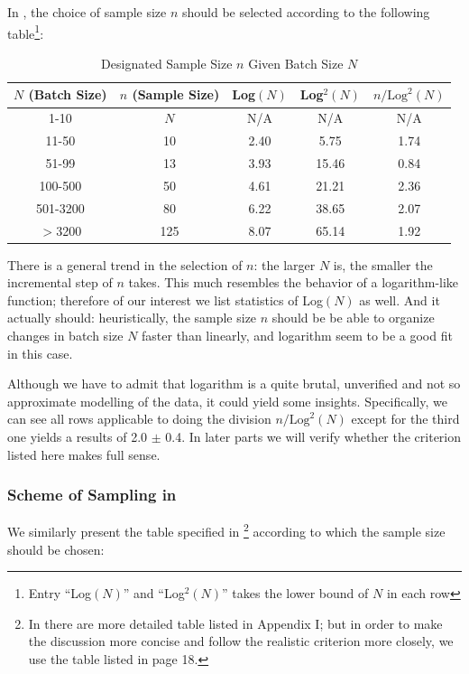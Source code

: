 \documentclass[12pt]{article}
\begin{document}
In \cite{JJF2005}, the choice of sample size $n$ should be selected according to the following table\footnote{Entry ``Log$(N)$'' and ``Log$^2(N)$'' takes the lower bound of $N$ in each row}:

\begin{table}[htbp]
    \centering
    \begin{tabular}{ccccc}
        \toprule
        $N$ (Batch Size) & $n$ (Sample Size) & Log$(N)$ & Log$^2(N)$ & $n/\text{Log}^2(N)$ \\
        \midrule
        1-10 & $N$ & N/A & N/A & N/A \\
        11-50 & 10 & 2.40 & 5.75 & 1.74 \\
        51-99 & 13 & 3.93 & 15.46 & 0.84 \\
        100-500 & 50 & 4.61 & 21.21 & 2.36 \\ 
        501-3200 & 80 & 6.22 & 38.65 & 2.07 \\
        $>$3200 & 125 & 8.07 & 65.14 & 1.92 \\
        \bottomrule
    \end{tabular}
    \caption{Designated Sample Size $n$ Given Batch Size $N$}
\end{table}

There is a general trend in the selection of $n$: the larger $N$ is, the smaller the incremental step of $n$ takes. This much resembles the behavior of a logarithm-like function; therefore of our interest we list statistics of Log$(N)$ as well. And it actually should: heuristically, the sample size $n$ should be be able to organize changes in batch size $N$ faster than linearly, and logarithm seem to be a good fit in this case. 

Although we have to admit that logarithm is a quite brutal, unverified and not so approximate modelling of the data, it could yield some insights. Specifically, we can see all rows applicable to doing the division $n/\text{Log}^2(N)$ except for the third one yields a results of 2.0 $\pm$ 0.4. In later parts we will verify whether the criterion listed here makes full sense. 

\subsubsection{Scheme of Sampling in \cite{OIML2016}}

We similarly present the table specified in \cite{OIML2016}\footnote{In \cite{OIML2016} there are more detailed table listed in Appendix I; but in order to make the discussion more concise and follow the realistic criterion more closely, we use the table listed in page 18.} according to which the sample size should be chosen:
\end{document}
